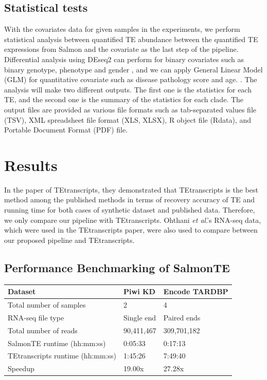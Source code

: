 \documentclass{ws-procs11x85}
\newcommand{\etal}{\textit{et al}.}
\begin{document}
\subsection{Statistical tests}

With the covariates data for given samples in the experiments, 
we perform statistical analysis between quantified TE abundance between the quantified TE expressions from Salmon and the covariate as the last step of the pipeline. Differential analysis using DEseq2 can perform for binary covariates such as binary genotype, phenotype and gender \cite{love2014moderated}, and 
we can apply General Linear Model (GLM) for quantitative covariate such as disease pathology score and age. \cite{johnston1980multivariate}. The analysis will make two different outputs. The first one is the statistics for each TE, and the second one is the summary of the statistics for each clade. The output files are provided as various file formats such as tab-separated values file (TSV), XML spreadsheet file format (XLS, XLSX), R object file (Rdata), and Portable Document Format (PDF) file.

\section{Results}

In the paper of TEtranscripts, they demonstrated that TEtranscripts is the best method among the published methods 
in terms of recovery accuracy of TE and running time for both cases of synthetic dataset and published data. 
Therefore, we only compare our pipeline with TEtranscripts. 
Ohthani \etal's RNA-seq data, which were used in the TEtranscripts paper, were also used to compare between 
our proposed pipeline and TEtranscripts. \cite{ohtani2013dmgtsf1}  

\subsection{Performance Benchmarking of SalmonTE}

\begin{table}[h]
{\begin{tabular}{l|ll}
\hline
Dataset                          & Piwi KD    & Encode TARDBP \\ \hline
Total number of samples          & 2          & 4             \\ 
RNA-seq file type                & Single end & Paired ends  \\ 
Total number of reads            & 90,411,467 & 309,701,182   \\ \hline
SalmonTE runtime (hh:mm:ss)      & 0:05:33    & 0:17:13       \\
TEtranscripts runtime (hh:mm:ss) & 1:45:26    & 7:49:40       \\
Speedup                          & 19.00x     & 27.28x        \\ \hline
\end{tabular}}\label{aba:table1}
\end{table}
\end{document}
